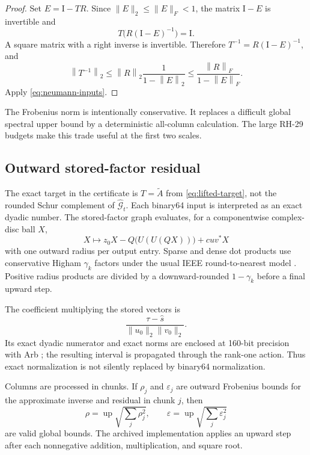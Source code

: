 \documentclass[11pt]{article}
\theoremstyle{definition}
\theoremstyle{remark}
\newcommand{\Id}{\mathrm I}
\newcommand{\norm}[1]{\left\lVert#1\right\rVert}
\newcommand{\Atilde}{\widetilde A}
\newcommand{\Gmat}{\mathcal G}
\begin{document}
\begin{proof}
Set $E=\Id-TR$.  Since
$\|E\|_2\leq\|E\|_F<1$, the matrix $\Id-E$ is invertible and
\[
 T\bigl(R(\Id-E)^{-1}\bigr)=\Id.
\]
A square matrix with a right inverse is invertible.  Therefore
$T^{-1}=R(\Id-E)^{-1}$, and
\[
 \norm{T^{-1}}_2
 \leq \norm{R}_2\frac{1}{1-\norm{E}_2}
 \leq \frac{\norm{R}_F}{1-\norm{E}_F}.
\]
Apply \cref{eq:neumann-inputs}.
\end{proof}

The Frobenius norm is intentionally conservative.  It replaces a difficult
global spectral upper bound by a deterministic all-column calculation.  The
large RH-29 budgets make this trade useful at the first two scales.

\subsection{Outward stored-factor residual}

The exact target in the certificate is $T=\Atilde$ from
\cref{eq:lifted-target}, not the rounded Schur complement of
$\widehat{\Gmat}_t$.  Each binary64 input is interpreted as an exact dyadic
number.  The stored-factor graph evaluates, for a componentwise complex-disc
ball $X$,
\begin{equation}
 X\longmapsto z_0X-Q\bigl(U(U(QX))\bigr)+cuv^*X
 \label{eq:stored-factor-action}
\end{equation}
with one outward radius per output entry.  Sparse and dense dot products use
conservative Higham $\gamma_k$ factors under the usual IEEE round-to-nearest
model \citep{Higham2002,Rump2010}.  Positive radius products are divided by a
downward-rounded $1-\gamma_k$ before a final upward step.

The coefficient multiplying the stored vectors is
\begin{equation}
 \frac{\tau-\widehat s}{\|u_0\|_2\|v_0\|_2}.
 \label{eq:normalized-coefficient}
\end{equation}
Its exact dyadic numerator and exact norms are enclosed at 160-bit precision
with Arb \citep{Johansson2017}; the resulting interval is propagated through
the rank-one action.  Thus exact normalization is not silently replaced by
binary64 normalization.

Columns are processed in chunks.  If $\rho_j$ and $\varepsilon_j$ are
outward Frobenius bounds for the approximate inverse and residual in chunk
$j$, then
\begin{equation}
 \rho=\operatorname{up}\sqrt{\sum_j\rho_j^2},
 \qquad
 \varepsilon=\operatorname{up}\sqrt{\sum_j\varepsilon_j^2}
 \label{eq:chunk-combination}
\end{equation}
are valid global bounds.  The archived implementation applies an upward
step after each nonnegative addition, multiplication, and square root.
\end{document}
